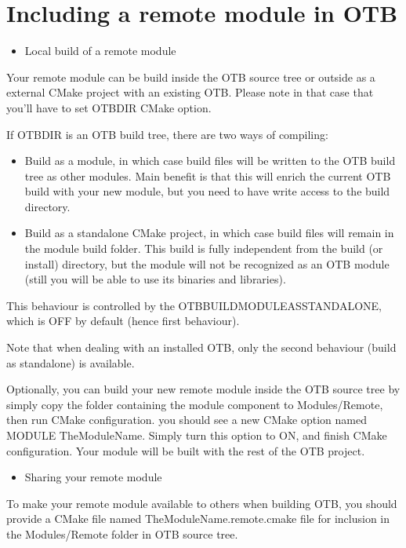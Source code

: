 \section{Including a remote module in OTB}
\begin{itemize}
       \item Local build of a remote module  
\end{itemize}

Your remote module can be build inside the OTB source tree or outside as a
external CMake project with an existing OTB. Please note in that case
that you'll have to set OTB\textunderscore DIR CMake option.

If OTB\textunderscore DIR is an OTB build tree, there are two ways of compiling:
\begin{itemize}
  \item Build as a module, in which case build files will be written
    to the OTB build tree as other modules. Main benefit is that this
    will enrich the current OTB build with your new module, but you
    need to have write access to the build directory.
  \item Build as a standalone CMake project, in which case build files
    will remain in the module build folder. This build is fully
    independent from the build (or install) directory, but the module
    will not be recognized as an OTB module (still you will be able to
    use its binaries and libraries).
\end{itemize}

This behaviour is controlled by the OTB\textunderscore BUILD\textunderscore MODULE\textunderscore AS\textunderscore STANDALONE, which is OFF by default (hence first behaviour).

Note that when dealing with an installed OTB, only the second behaviour (build as standalone) is available.

Optionally, you can build your new remote module inside the OTB source tree by simply copy
the folder containing the module component to Modules/Remote, then run CMake
configuration. you should see a new CMake option named MODULE\textunderscore
TheModuleName. Simply turn this option to ON, and finish CMake
configuration. Your module will be built with the rest of the OTB project.

\begin{itemize}
       \item  Sharing your remote module 
\end{itemize}

To make your remote module available to others when building OTB, you should
provide a CMake file named TheModuleName.remote.cmake file for inclusion in the
Modules/Remote folder in OTB source tree.

